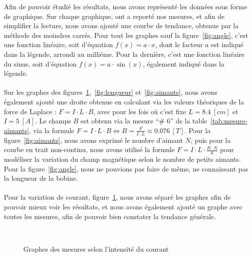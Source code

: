 \documentclass[11pt]{article}
\begin{document}
    Afin de pouvoir étudié les résultats, nous avons représenté les données sous forme de graphique.
    Sur chaque graphique, ont a reporté nos mesures, et afin de simplifier la lecture, nous avons
    ajouté une courbe de tendance, obtenue par la méthode des moindres carrés.
    Pour tout les graphes sauf la figure~\ref{fig:angle}, c'est une fonction linéaire, soit d'équation
    $ f(x) = a \cdot x $, dont le facteur $a$ est indiqué dans la légende, arrondi au millième.
    Pour la dernière, c'est une fonction linéaire du sinus, soit d'équation $ f(x) = a \cdot \sin(x) $,
    également indiqué dans la légende. \\ \\
    Sur les graphes des figures~\ref{fig:courant},~\ref{fig:longueur} et~\ref{fig:aimants}, nous avons
    également ajouté une droite obtenue en calculant via les valeurs théoriques de la force de Laplace :
    $ F = I \cdot L \cdot B $, avec pour les fois où c'est fixe $L = 8.4 \ [cm]$ et $I = 5 \ [A]$.
    Le champs $B$ est obtenu via la mesure ``\# 6'' de la table~\ref{tab:mesure-aimants}, via la formule
    $ F = I \cdot L \cdot B \Leftrightarrow B = \frac{F}{I \cdot L} \approx 0.076 \ [T] $.
    Pour la figure~\ref{fig:aimants}, nous avons exprimé le nombre d'aimant $N$, puis pour la courbe en trait
    non-continu, nous avons utilisé la formule $F = I \cdot L \cdot \frac{B \cdot N}{6} $ pour modéliser
    la variation du champ magnétique selon le nombre de petits aimants.\\
    Pour la figure~\ref{fig:angle}, nous ne pouvions pas faire de même, ne connaissant pas la longueur
    de la bobine.\\ \\
    Pour la variation de courant, figure~\ref{fig:courant}, nous avons séparé les graphes afin de pouvoir
    mieux voir les résultats, et nous avons également ajouté un graphe avec toutes les mesures, afin de
    pouvoir bien constater la tendance générale.\\

    \begin{figure}[H]
        \centering
        \\
        \hfill
        \caption{Graphes des mesures selon l'intensité du courant}
        \label{fig:courant}
    \end{figure}
\end{document}

